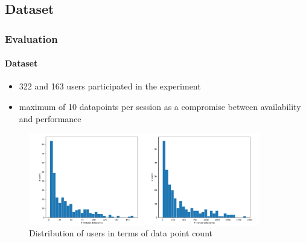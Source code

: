 \documentclass[t,aspectratio=169,table]{beamer}
\begin{document}
\subsection{Dataset}
\begin{frame}
\frametitle{Evaluation}
\framesubtitle{Dataset}

\begin{itemize}
    \item 322 and 163 users participated in the experiment
    \item maximum of 10 datapoints per session as a compromise between availability and performance
\end{itemize}

\begin{figure}[h]
    \includegraphics[width=0.9\textwidth]{figures/user_dp_hist.png}
    \caption{Distribution of users in terms of data point count}
    \label{fig:user_dp_hist}
\end{figure}

\end{frame}
\end{document}
